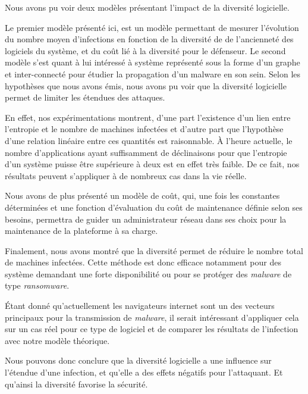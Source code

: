 Nous avons pu voir deux modèles présentant l'impact de la diversité logicielle. 

Le premier modèle présenté ici, est un modèle permettant de mesurer l'évolution du nombre moyen d'infections en fonction de la
diversité de de l'ancienneté des logiciels du système, et du coût lié à la diversité pour le défenseur. Le second modèle s'est quant à lui intéressé à système représenté sous la forme d'un graphe et inter-connecté pour étudier la propagation d'un malware en son sein. Selon les hypothèses que nous avons émis, nous avons pu voir que la diversité logicielle permet de limiter les étendues des attaques.

En effet, nos expérimentations montrent, d'une part l'existence d'un lien entre l'entropie et le nombre de machines infectées et d'autre part que l'hypothèse d'une
relation linéaire entre ces quantités est raisonnable. \`A l'heure actuelle, le nombre d'applications ayant suffisamment de
déclinaisons pour que l'entropie d'un système puisse être supérieure à deux est en effet très faible. De ce fait, nos résultats
peuvent s'appliquer à de nombreux cas dans la vie réelle. 

Nous avons de plus présenté un modèle de coût, qui, une fois les constantes déterminées et une fonction d'évaluation du coût de
maintenance définie selon ses besoins, permettra de guider un administrateur réseau dans ses choix pour la maintenance de la
plateforme à sa charge.

Finalement, nous avons montré que la diversité permet de réduire le nombre total de machines infectées.
Cette méthode est donc efficace notamment pour des système demandant une forte disponibilité ou pour se protéger des \textit{malware} de type \textit{ransomware}.

Étant donné qu'actuellement les navigateurs internet sont un des vecteurs principaux pour la transmission de \textit{malware}, il serait intéressant d'appliquer cela sur un cas réel pour ce type de logiciel et de comparer les résultats de l'infection avec notre modèle théorique.

Nous pouvons donc conclure que la diversité logicielle a une influence sur l'étendue d'une infection, et qu'elle a des effets négatifs pour l'attaquant. Et qu'ainsi la diversité favorise la sécurité. 